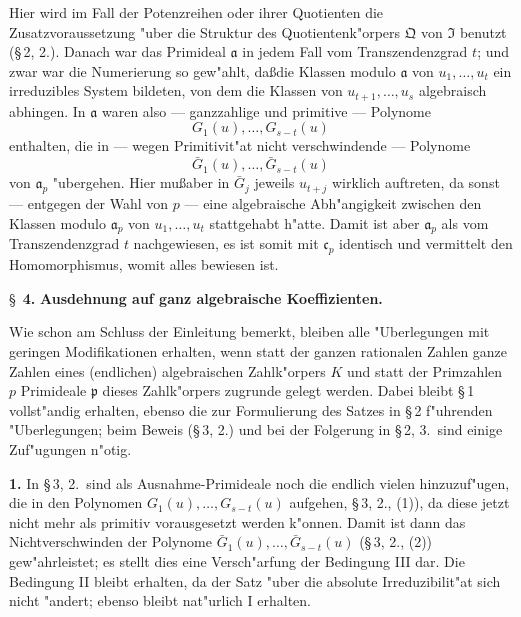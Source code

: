 Hier wird im Fall der Potenzreihen oder ihrer Quotienten die Zusatzvoraussetzung "uber die Struktur des Quotientenk"orpers $\mathfrak{Q}$ von $\mathfrak{I}$ benutzt (\S\,2, 2.). Danach war das Primideal $\mathfrak{a}$ in jedem Fall vom Transzendenzgrad $t$; und zwar war die Numerierung so gew"ahlt, da\ss die Klassen modulo $\mathfrak{a}$ von $u_1,\ldots,u_t$ ein irreduzibles System bildeten, von dem die Klassen von $u_{t+1},\ldots,u_s$ algebraisch abhingen. In $\mathfrak{a}$ waren also --- ganzzahlige und primitive --- Polynome
\[
G_1(u),\ldots,G_{s-t}(u)\tag{1}
\]
enthalten, die in --- wegen Primitivit"at nicht verschwindende --- Polynome
\[
\bar{G}_1(u),\ldots,\bar{G}_{s-t}(u)\tag{2}
\]
von $\mathfrak{a}_p$ "ubergehen. Hier mu\ss aber in $\bar{G}_j$ jeweils $u_{t+j}$ wirklich auftreten, da sonst --- entgegen der Wahl von $p$ --- eine algebraische Abh"angigkeit zwischen den Klassen modulo $\mathfrak{a}_p$ von $u_1,\ldots,u_t$ stattgehabt h"atte. Damit ist aber $\mathfrak{a}_p$ als vom Transzendenzgrad $t$ nachgewiesen, es ist somit mit $\mathfrak{c}_p$ identisch und vermittelt den Homomorphismus, womit alles bewiesen ist.

\newpage
\S~\textbf{4.}
\textbf{Ausdehnung auf ganz algebraische Koeffizienten.}

\smallskip

\noindent
Wie schon am Schluss der Einleitung bemerkt, bleiben alle "Uberlegungen mit geringen Modifikationen erhalten, wenn statt der ganzen rationalen Zahlen ganze Zahlen eines (endlichen) algebraischen Zahlk"orpers $K$ und statt der Primzahlen $p$ Primideale $\mathfrak{p}$ dieses Zahlk"orpers zugrunde gelegt werden. Dabei bleibt \S\,1 vollst"andig erhalten, ebenso die zur Formulierung des Satzes in \S\,2 f"uhrenden "Uberlegungen; beim Beweis (\S\,3, 2.) und bei der Folgerung in \S\,2, 3.\ sind einige Zuf"ugungen n"otig.

\medskip\noindent\textbf{1.}
In \S\,3, 2.\ sind als Ausnahme-Primideale noch die endlich vielen hinzuzuf"ugen, die in den Polynomen $G_1(u),\ldots,G_{s-t}(u)$ aufgehen, \S\,3, 2., (1)), da diese jetzt nicht mehr als primitiv vorausgesetzt werden k"onnen. Damit ist dann das Nichtverschwinden der Polynome $\bar{G}_1(u),\ldots,\bar{G}_{s-t}(u)$ (\S\,3, 2., (2)) gew"ahrleistet; es stellt dies eine Versch"arfung der Bedingung III dar. Die Bedingung II bleibt erhalten, da der Satz "uber die absolute Irreduzibilit"at sich nicht "andert; ebenso bleibt nat"urlich I erhalten.

